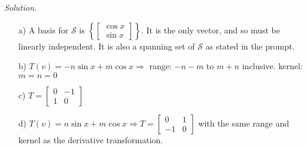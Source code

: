 \documentclass[12pt,pdftex]{article}
\begin{document}
\textit{Solution.}
\begin{itemize}
\item[a)] A basis for $\mathcal{S}$ is 
			$\left\{\begin{bmatrix} \cos x \\ \sin x\end{bmatrix}\right\}$. It is the only vector, and so must be linearly independent.
            It is also a spanning set of $\mathcal{S}$ as stated in the prompt.
\item[b)] $T(v)=-n\sin x + m \cos x \Rightarrow$ range: $-n-m$ to $m+n$ inclusive. 
			kernel: $m=n=0$
\item[c)] $T=\begin{bmatrix}
			0 & -1 \\ 1 & 0
			\end{bmatrix}$
\item[d)] $T(v)=n\sin x + m \cos x \Rightarrow T=\begin{bmatrix}
0 & 1 \\ -1 & 0
\end{bmatrix}$ with the same range and kernel as the derivative transformation.
\end{itemize}
\end{document}
